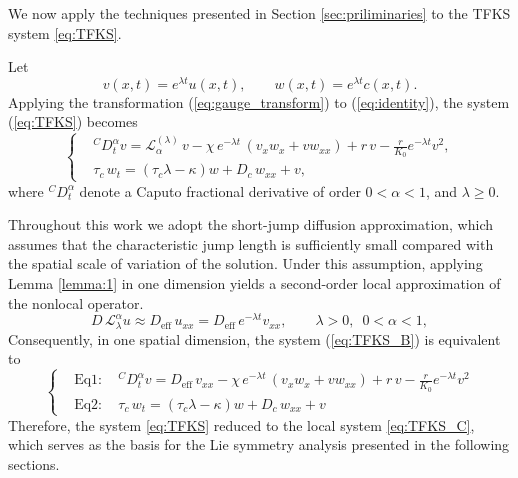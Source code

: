 \documentclass{article}
\begin{document}
We now apply the techniques presented in Section \ref{sec:priliminaries} to the TFKS system \eqref{eq:TFKS}.
\par 
Let
\begin{equation}\label{eq:gauge_transform}
v(x,t)=e^{\lambda t}u(x,t), \qquad w(x,t) = e^{\lambda t}c(x,t).
\end{equation}
Applying the transformation (\ref{eq:gauge_transform}) to (\ref{eq:identity}), the system (\ref{eq:TFKS}) becomes
\begin{equation}\label{eq:TFKS_B}
\begin{cases} 
&{}^{C}D_t^{\alpha} v= \mathcal{L}^{(\lambda)}_{\alpha}\,v - \chi\,e^{-\lambda t}\,\left(v_{x}w_x + v w_{xx}\right)+ r\,v - \frac{r}{K_0}e^{-\lambda t}v^2, \\
& \tau_c\,w_t = (\tau_c\lambda - \kappa) w + D_c\,w_{xx} + v ,
\end{cases}
\end{equation}
where ${}^{C}D_t^{\alpha}$ denote a Caputo fractional derivative of order $0<\alpha < 1$, and $\lambda\geq 0$.
\par 
Throughout this work we adopt the short-jump diffusion approximation, which assumes that the characteristic jump length is sufficiently small compared with the spatial scale of variation of the solution. Under this assumption, applying Lemma \ref{lemma:1} in one dimension yields a second-order local approximation of the nonlocal operator.
\begin{equation}\label{eq:Laplacian}
D\,\mathcal{L}^\alpha_\lambda u \approx D_{\mathrm{eff}}\,u_{xx} = D_{\mathrm{eff}}\, e^{-\lambda t} v_{xx},\qquad \lambda > 0,\,\,\, 0<\alpha < 1,
\end{equation}
Consequently, in one spatial dimension, the system (\ref{eq:TFKS_B}) is equivalent to
\begin{equation}\label{eq:TFKS_C}
\begin{cases} 
&\mathrm{Eq 1}:\quad  {}^{C}D_t^{\alpha} v= D_{\mathrm{eff}}\,v_{xx} - \chi\,e^{-\lambda t}\,\left(v_{x}w_x + v w_{xx}\right)+ r\,v - \frac{r}{K_0}e^{-\lambda t}v^2 \\
&\mathrm{Eq 2}:\quad  \tau_c\,w_t = (\tau_c\lambda - \kappa) w + D_c\,w_{xx} + v 
\end{cases}
\end{equation}
Therefore, the system \eqref{eq:TFKS} reduced to the local system \eqref{eq:TFKS_C}, which serves as the basis for the Lie symmetry analysis presented in the following sections.
\end{document}

